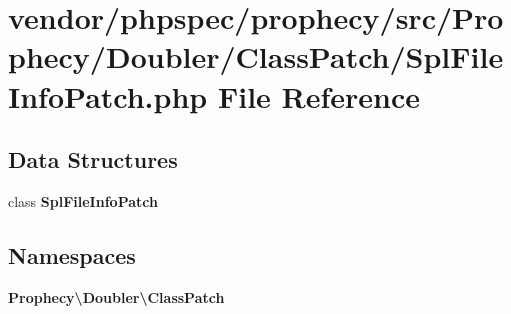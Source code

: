 \section{vendor/phpspec/prophecy/src/\+Prophecy/\+Doubler/\+Class\+Patch/\+Spl\+File\+Info\+Patch.php File Reference}
\label{_spl_file_info_patch_8php}
\subsection*{Data Structures}
\begin{DoxyCompactItemize}
\item 
class {\bf Spl\+File\+Info\+Patch}
\end{DoxyCompactItemize}
\subsection*{Namespaces}
\begin{DoxyCompactItemize}
\item 
 {\bf Prophecy\textbackslash{}\+Doubler\textbackslash{}\+Class\+Patch}
\end{DoxyCompactItemize}
